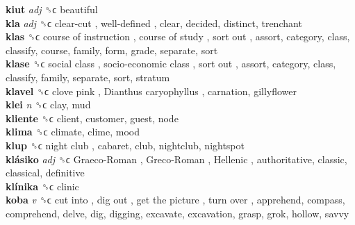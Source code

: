 \textbf{kiut} \emph{adj}  ␝ϲ  beautiful  \\
\textbf{kla} \emph{adj}  ␝ϲ   clear-cut ,  well-defined , clear, decided, distinct, trenchant  \\
\textbf{klas} ␝ϲ   course of instruction ,  course of study ,  sort out , assort, category, class, classify, course, family, form, grade, separate, sort  \\
\textbf{klase} ␝ϲ   social class ,  socio-economic class ,  sort out , assort, category, class, classify, family, separate, sort, stratum  \\
\textbf{klavel} ␝ϲ   clove pink ,  Dianthus caryophyllus , carnation, gillyflower  \\
\textbf{klei} \emph{n}  ␝ϲ  clay, mud  \\
\textbf{kliente} ␝ϲ  client, customer, guest, node  \\
\textbf{klima} ␝ϲ  climate, clime, mood  \\
\textbf{klup} ␝ϲ   night club , cabaret, club, nightclub, nightspot  \\
\textbf{klásiko} \emph{adj}  ␝ϲ   Graeco-Roman ,  Greco-Roman ,  Hellenic , authoritative, classic, classical, definitive  \\
\textbf{klínika} ␝ϲ  clinic  \\
\textbf{koba} \emph{v}  ␝ϲ   cut into ,  dig out ,  get the picture ,  turn over , apprehend, compass, comprehend, delve, dig, digging, excavate, excavation, grasp, grok, hollow, savvy  \\
